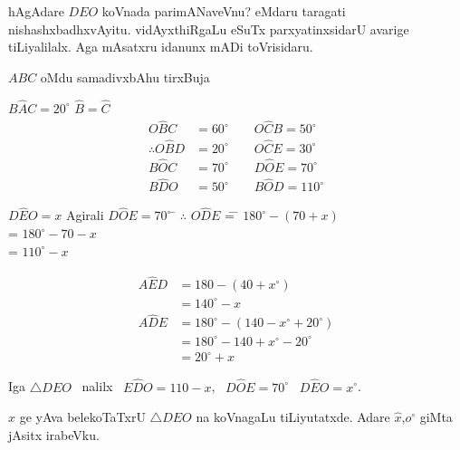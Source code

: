 hAgAdare $DEO$ koVnada parimANaveVnu? eMdaru taragati nishashxbadhxvAyitu. vidAyxthiRgaLu eSuTx parxyatinxsidarU avarige tiLiyalilalx. Aga mAsatxru idanunx mADi toVrisidaru.

$ABC$ \quad oMdu samadivxbAhu tirxBuja

$B\widehat{A}C=20^\circ$ \qquad $\widehat{B}=\widehat{C}$
\begin{align*}
O\widehat{B}C &=60^\circ  \qquad O\widehat{C}B =50^\circ\\
\therefore O\widehat{B}D  &=20^\circ  \qquad O\widehat{C}E =30^\circ\\
B\widehat{O}C &=70^\circ   \qquad D\widehat{O}E =70^\circ\\
B\widehat{D}O &=50^\circ   \qquad B\widehat{O}D =110^\circ
\end{align*}

\begin{tabbing}
$D\widehat{E}O=x$  \; \; Agirali \;\; $D\widehat{O}E=70^\circ$ \;\; \= $\therefore$ \;\; $O\widehat{D}E$ \= = \= $180^\circ-(70+x)$\\
\> \> = \> $180^\circ-70-x$\\
\> \> = \> $110^\circ-x$
\end{tabbing}
\begin{align*}
A\widehat{E}D &=180-(40+x^\circ)\\
&=140^\circ-x\\
A\widehat{D}E & =180^\circ-(140-x^\circ+20^\circ)\\
&=180^\circ-140+x^\circ-20^\circ\\
& =20^\circ+x
\end{align*} 

Iga $\bigtriangleup DEO$~ nalilx~ $E\widehat{D}O=110-x$,~ $D\widehat{O}E=70^\circ$~ $D\widehat{E}O=x^\circ$.

$x$ ge yAva belekoTaTxrU $\bigtriangleup DEO$ na koVnagaLu tiLiyutatxde. Adare  $\widehat{x}$,\break $o^\circ$ giMta jAsitx irabeVku.
